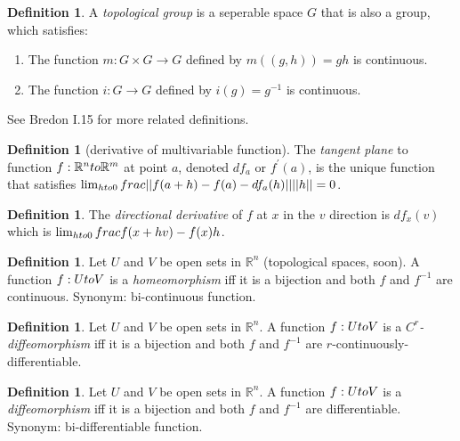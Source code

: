\documentclass[11pt,leqno,oneside]{amsart}
\theoremstyle{definition}
\newtheorem{defn}[thm]{Definition}
\numberwithin{equation}{section}
\begin{document}
\begin{defn}
	A \emph{topological group} is a seperable space $G$ that is also a group, which satisfies:
	\begin{enumerate}
		\item The function $m : G \times G \to G$ defined by $m((g,h)) = gh$ is continuous.
		\item The function $i : G \to G$ defined by $i(g) = g^{-1}$ is continuous.
	\end{enumerate}
	See Bredon I.15 for more related definitions.
\end{defn}












\begin{defn}[derivative of multivariable function]
	The \emph{tangent plane} to function $f : \mathbb{R}^n \\to \mathbb{R}^m$ at point $a$, denoted $df_a$ or $f^{\prime}(a)$, is the unique function that satisfies $\lim_{h\\to 0} \\frac{||f(a+h) - f(a) - df_a(h)||}{||h||} = 0$.
\end{defn}
\begin{defn}
	The \emph{directional derivative} of $f$ at $x$ in the $v$ direction is $df_x(v)$ which is $\lim_{h\\to 0} \\frac{f(x+hv) - f(x)}{h}$.
\end{defn}
\begin{defn}
	Let $U$ and $V$ be open sets in $\mathbb{R}^n$ (topological spaces, soon).  A function $f:U\\to V$ is a \emph{homeomorphism} iff it is a bijection and both $f$ and $f^{-1}$ are continuous.
	Synonym: bi-continuous function.
\end{defn}
\begin{defn}
	Let $U$ and $V$ be open sets in $\mathbb{R}^n$.  A function $f:U\\to V$ is a \emph{$C^r$-diffeomorphism} iff it is a bijection and both $f$ and $f^{-1}$ are $r$-continuously-differentiable.
\end{defn}
\begin{defn}
	Let $U$ and $V$ be open sets in $\mathbb{R}^n$.  A function $f:U\\to V$ is a \emph{diffeomorphism} iff it is a bijection and both $f$ and $f^{-1}$ are differentiable.
	Synonym: bi-differentiable function.
\end{defn}
\end{document}
